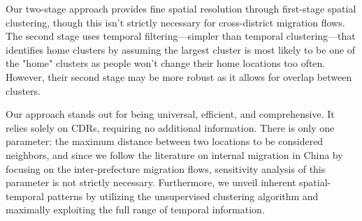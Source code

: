 Our two-stage approach provides fine spatial resolution through first-stage spatial clustering, though this isn't strictly necessary for cross-district migration flows.
The second stage uses temporal filtering---simpler than temporal clustering---that identifies home clusters by assuming the largest cluster is most likely to be one of the "home" clusters as people won't change their home locations too often.
However, their second stage may be more robust as it allows for overlap between clusters.

Our approach stands out for being universal, efficient, and comprehensive.
It relies solely on CDRs, requiring no additional information.
There is only one parameter: the maximum distance between two locations to be considered neighbors, and since we follow the literature on internal migration in China by focusing on the inter-prefecture migration flows, sensitivity analysis of this parameter is not strictly necessary.
Furthermore, we unveil inherent spatial-temporal patterns by utilizing the unsupervised clustering algorithm and maximally exploiting the full range of temporal information.
